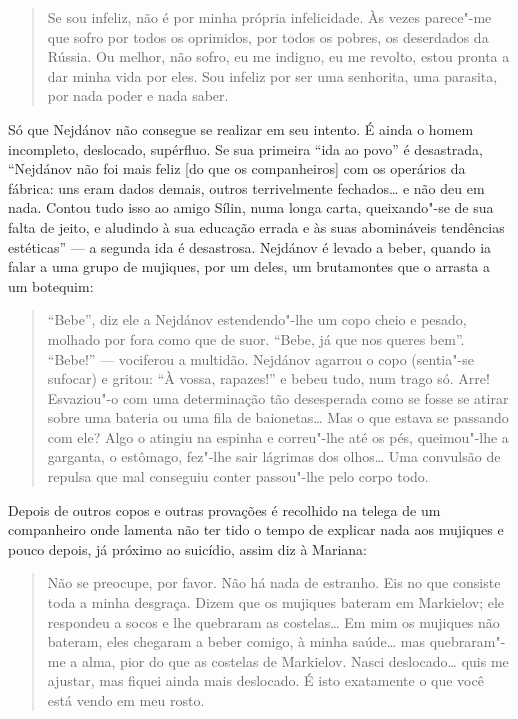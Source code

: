 \begin{quote}
Se sou infeliz, não é por minha própria infelicidade. Às vezes parece"-me
que sofro por todos os oprimidos, por todos os pobres, os deserdados da
Rússia. Ou melhor, não sofro, eu me indigno, eu me revolto, estou pronta
a dar minha vida por eles. Sou infeliz por ser uma senhorita, uma
parasita, por nada poder e nada saber.
\end{quote}

Só que Nejdánov não consegue se realizar em seu intento. É ainda o
homem incompleto, deslocado, supérfluo. Se sua primeira ``ida ao povo''
é desastrada, ``Nejdánov não foi mais feliz [do que os companheiros]
com os operários da fábrica: uns eram dados demais, outros
terrivelmente fechados\ldots{} e não deu em nada. Contou tudo isso ao amigo
Sílin, numa longa carta, queixando"-se de sua falta de jeito, e aludindo
à sua educação errada e às suas abomináveis tendências estéticas'' --- a
segunda ida é desastrosa. Nejdánov é levado a beber, quando ia falar a
uma grupo de mujiques, por um deles, um brutamontes que o arrasta a um
botequim:

\begin{quote}
``Bebe'', diz ele a Nejdánov estendendo"-lhe um copo cheio e pesado, molhado
por fora como que de suor. ``Bebe, já que nos queres bem''. ``Bebe!'' ---
vociferou a multidão. Nejdánov agarrou o copo (sentia"-se sufocar) e
gritou: ``À vossa, rapazes!'' e bebeu tudo, num trago só. Arre! Esvaziou"-o
com uma determinação tão desesperada como se fosse se atirar sobre uma
bateria ou uma fila de baionetas\ldots{} Mas o que estava se passando com
ele? Algo o atingiu na espinha e correu"-lhe até os pés, queimou"-lhe a
garganta, o estômago, fez"-lhe sair lágrimas dos olhos\ldots{} Uma convulsão
de repulsa que mal conseguiu conter passou"-lhe pelo corpo todo.
\end{quote}

Depois de outros copos e outras provações é recolhido na telega de um
companheiro onde lamenta não ter tido o tempo de explicar nada aos
mujiques e pouco depois, já próximo ao suicídio, assim diz à Mariana:

\begin{quote}
Não se preocupe, por favor. Não há nada de estranho. Eis no que consiste
toda a minha desgraça. Dizem que os mujiques bateram em Markielov; ele
respondeu a socos e lhe quebraram as costelas\ldots{} Em mim os mujiques não
bateram, eles chegaram a beber comigo, à minha saúde\ldots{} mas quebraram"-me
a alma, pior do que as costelas de Markielov. Nasci deslocado\ldots{} quis me
ajustar, mas fiquei ainda mais deslocado. É isto exatamente o que você
está vendo em meu rosto.
\end{quote}

